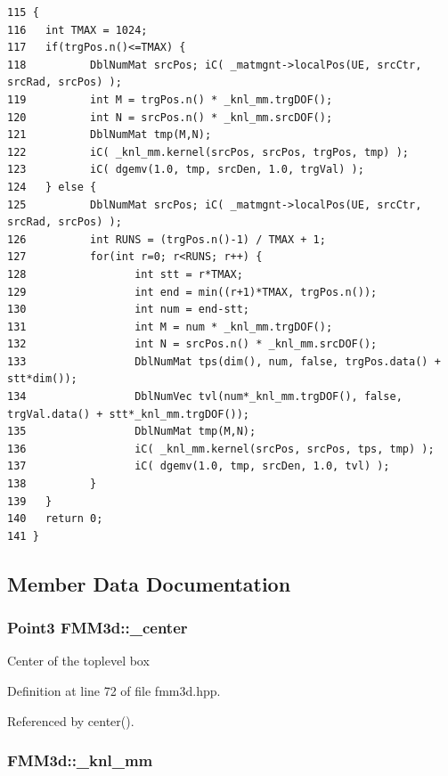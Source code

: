 \footnotesize\begin{verbatim}115 {
116   int TMAX = 1024;
117   if(trgPos.n()<=TMAX) {
118          DblNumMat srcPos; iC( _matmgnt->localPos(UE, srcCtr, srcRad, srcPos) );
119          int M = trgPos.n() * _knl_mm.trgDOF();
120          int N = srcPos.n() * _knl_mm.srcDOF();
121          DblNumMat tmp(M,N);
122          iC( _knl_mm.kernel(srcPos, srcPos, trgPos, tmp) );
123          iC( dgemv(1.0, tmp, srcDen, 1.0, trgVal) );
124   } else {
125          DblNumMat srcPos; iC( _matmgnt->localPos(UE, srcCtr, srcRad, srcPos) );
126          int RUNS = (trgPos.n()-1) / TMAX + 1;
127          for(int r=0; r<RUNS; r++) {
128                 int stt = r*TMAX;
129                 int end = min((r+1)*TMAX, trgPos.n());
130                 int num = end-stt;
131                 int M = num * _knl_mm.trgDOF();
132                 int N = srcPos.n() * _knl_mm.srcDOF();
133                 DblNumMat tps(dim(), num, false, trgPos.data() + stt*dim());
134                 DblNumVec tvl(num*_knl_mm.trgDOF(), false, trgVal.data() + stt*_knl_mm.trgDOF());
135                 DblNumMat tmp(M,N);
136                 iC( _knl_mm.kernel(srcPos, srcPos, tps, tmp) );
137                 iC( dgemv(1.0, tmp, srcDen, 1.0, tvl) );
138          }
139   }
140   return 0;
141 }
\end{verbatim}\normalsize 




\subsection{Member Data Documentation}
\subsubsection{\setlength{\rightskip}{0pt plus 5cm}Point3 {\bf FMM3d::\_\-center}\hspace{0.3cm}{\tt  [protected]}}\label{classFMM3d_391969e82e332503da2a0d69072f0229_391969e82e332503da2a0d69072f0229}


Center of the toplevel box 

Definition at line 72 of file fmm3d.hpp.

Referenced by center().
\subsubsection{ {\bf FMM3d::\_\-knl\_\-mm}\hspace{0.3cm}{\tt  [protected]}}\label{classFMM3d_682802df2db70f31a8144d86c0116993_682802df2db70f31a8144d86c0116993}





